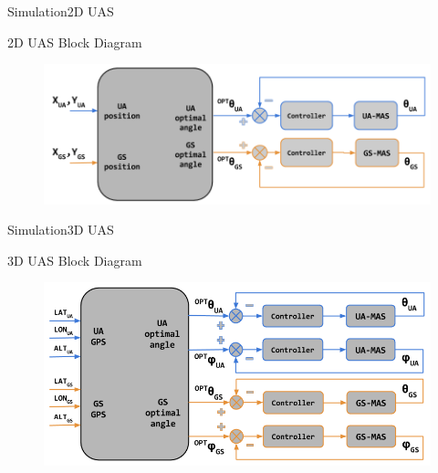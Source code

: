 \begin{frame}{Simulation}{2D UAS}
	\begin{block}{2D UAS Block Diagram}

		\begin{figure}
	        \includegraphics[scale=0.32]{figures/2D_system.png}
	    \end{figure}
    \end{block}
\end{frame}

\begin{frame}{Simulation}{3D UAS}
  \begin{block}{3D UAS Block Diagram}

		\begin{figure}
	        \includegraphics[scale=0.35]{figures/3D_system.png}
	    \end{figure}
  \end{block}
\end{frame}